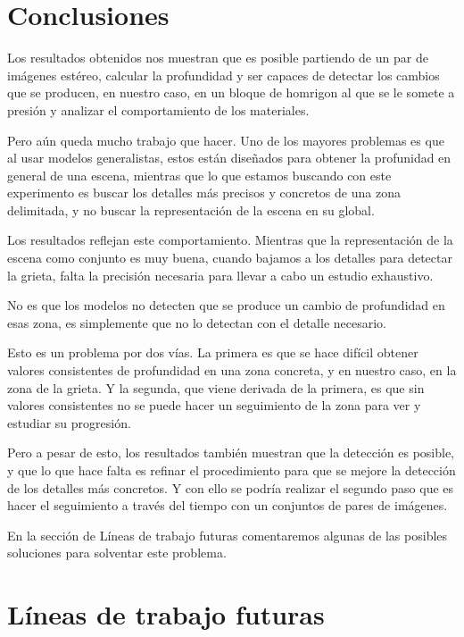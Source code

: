 
\section{Conclusiones}
Los resultados obtenidos nos muestran que es posible partiendo de un par de imágenes estéreo, calcular la profundidad y ser capaces de detectar los cambios que se producen, en nuestro caso, en un bloque de homrigon al que se le somete a presión y analizar el comportamiento de los materiales.

Pero aún queda mucho trabajo que hacer. Uno de los mayores problemas es que al usar modelos generalistas, estos están diseñados para obtener la profunidad en general de una escena, mientras que lo que estamos buscando con este experimento es buscar los detalles más precisos y concretos de una zona delimitada, y no buscar la representación de la escena en su global.

Los resultados reflejan este comportamiento. Mientras que la representación de la escena como conjunto es muy buena, cuando bajamos a los detalles para detectar la grieta, falta la precisión necesaria para llevar a cabo un estudio exhaustivo.

No es que los modelos no detecten que se produce un cambio de profundidad en esas zona, es simplemente que no lo detectan con el detalle necesario.

Esto es un problema por dos vías. La primera es que se hace difícil obtener valores consistentes de profundidad en una zona concreta, y en nuestro caso, en la zona de la grieta. Y la segunda, que viene derivada de la primera, es que sin valores consistentes no se puede hacer un seguimiento de la zona para ver y estudiar su progresión.

Pero a pesar de esto, los resultados también muestran que la detección es posible, y que lo que hace falta es refinar el procedimiento para que se mejore la detección de los detalles más concretos. Y con ello se podría realizar el segundo paso que es hacer el seguimiento a través del tiempo con un conjuntos de pares de imágenes.

En la sección de Líneas de trabajo futuras comentaremos algunas de las posibles soluciones para solventar este problema.

\section{Líneas de trabajo futuras}

